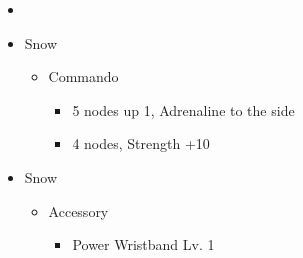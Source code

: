 \begin{menu}
\begin{itemize}
    \paradigm
    \begin{itemize}
        \item {}%
{\paradigmline[1]{\textit{\com}}{\textit{\rav}}{}}%
{\paradigmline{\com}{\med}{}}%
{\paradigmline{\sen}{\med}{}}%
{\paradigmline{\sen}{\syn}{}}%
{\paradigmline{[\rav]}{\rav}{}}%
{\paradigmline{[\rav]}{\rav}{}}
    \end{itemize}
    \crystarium
    \begin{itemize}
        \item Snow
        \begin{itemize}
            \item Commando
            \begin{itemize}
                \item 5 nodes up 1, Adrenaline to the side
                \item 4 nodes, Strength +10
            \end{itemize}
        \end{itemize}
    \end{itemize}
    \equip
    \begin{itemize}
        \item Snow
        \begin{itemize}
            \item Accessory
            \begin{itemize}
                \item Power Wristband Lv. 1
            \end{itemize}
        \end{itemize}
    \end{itemize}
\end{itemize}
\end{menu}
\renewcommand{\first}{[1] Slash \& Burn (\com/\rav)}
\renewcommand{\second}{[2] War \& Peace (\com/\med)}
\renewcommand{\fifth}{[5] Dualcasting (\rav/\rav)}
\renewcommand{\sixth}{[6] Dualcasting (\rav/\rav)}

